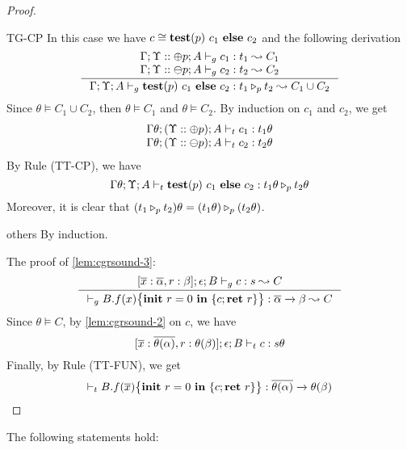 {{{\begin{proof}
\begin{ProofEnumDesc}
\item[TG-CP] In this case we have $c \cong \lcCP{p}{c_1}{c_2}$ and the following derivation
\begin{equation*}
\inference
{
\Gamma;\trace::\tplus p; A \vdash_{g} c_1 : t_1  \leadsto C_1 \\
 \Gamma;\trace::\tminus p; A \vdash_{g} c_2 : t_2  \leadsto C_2
 }
{\Gamma;\trace; A \vdash_{g} \lcCP{p}{c_1}{c_2} : \omerge{p}{t_1}{t_2} \leadsto C_1\cup C_2}
\end{equation*}
Since $\theta \vDash C_1 \cup C_2$, then $\theta\vDash C_1$ and $\theta \vDash C_2$.
By induction on $c_1$ and $c_2$, we get
$$
\begin{array}{l}
\Gamma\theta;(\trace::\tplus p);  A \vdash_{t} c_1 : t_1\theta\\
\Gamma\theta;(\trace::\tminus p); A \vdash_{t} c_2 : t_2\theta
\end{array}
$$
By Rule {(TT-CP)}, we have
$$
\Gamma\theta;\trace; A \vdash_{t} \lcCP{p}{c_1}{c_2} : \omerge{p}{t_1\theta}{t_2\theta}
$$
Moreover, it is clear that $(\omerge{p}{t_1}{t_2})\theta = \omerge{p}{(t_1\theta)}{(t_2\theta)}$.

\item[others] By induction.
\end{ProofEnumDesc}
The proof of \ref{lem:cgrsound-3}:\\
\begin{equation*}
\inference
{
[\overline{x}: \overline{\alpha},\lpRES:\beta]; \epsilon; B \vdash_{g} c : s  \leadsto C \\
}
{
\vdash_{g} \lpPROG{B.f}{x}{c}{\lpRES} :  \overline{\alpha}\xrightarrow{} \beta  \leadsto  C
}
\end{equation*}
Since $\theta \vDash C$,
by \ref{lem:cgrsound-2} on $c$, we have
$$
[\overline{ x}: \overline{\theta(\alpha)},\lpRES:\theta(\beta)];\epsilon; B \vdash_{t} c : s\theta
$$
Finally, by Rule {(TT-FUN)}, we get
$$
\vdash_{t} \lpPROG{B.f}{\overline{x}}{c}{\lpRES} : \overline{\theta(\alpha)}\xrightarrow{} \theta(\beta)
$$
\end{proof}




\begin{lemma}\label{lem:cgrcomplete}
The following statements hold:
\begin{enumerate}[label={(\alph*)}]


\end{enumerate}
\end{lemma}}}}
